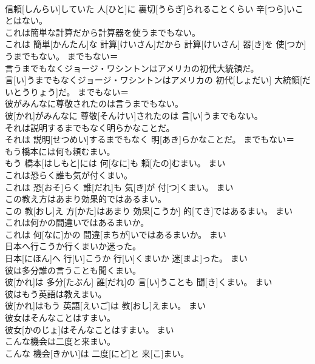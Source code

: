 \documentclass[8pt]{extreport}
\begin{document}
\begin{CJK}{UTF8}{min}
\\	信頼[しんらい]していた 人[ひと]に 裏切[うらぎ]られることくらい 辛[つら]いことはない。	
\\	これは簡単な計算だから計算器を使うまでもない。	
\\	これは 簡単[かんたん]な 計算[けいさん]だから 計算[けいさん] 器[き]を 使[つか]うまでもない。	までもない＝ 
\\	言うまでもなくジョージ・ワシントンはアメリカの初代大統領だ。	
\\	言[い]うまでもなくジョージ・ワシントンはアメリカの 初代[しょだい] 大統領[だいとうりょう]だ。	までもない＝ 
\\	彼がみんなに尊敬されたのは言うまでもない。	
\\	彼[かれ]がみんなに 尊敬[そんけい]されたのは 言[い]うまでもない。	
\\	それは説明するまでもなく明らかなことだ。	
\\	それは 説明[せつめい]するまでもなく 明[あき]らかなことだ。	までもない＝ 
\\	もう橋本には何も頼むまい。	
\\	もう 橋本[はしもと]には 何[なに]も 頼[たの]むまい。	まい 
\\	これは恐らく誰も気が付くまい。	
\\	これは 恐[おそ]らく 誰[だれ]も 気[き]が 付[つ]くまい。	まい 
\\	この教え方はあまり効果的ではあるまい。	
\\	この 教[おし]え 方[かた]はあまり 効果[こうか] 的[てき]ではあるまい。	まい 
\\	これは何かの間違いではあるまいか。	
\\	これは 何[なに]かの 間違[まちが]いではあるまいか。	まい 
\\	日本へ行こうか行くまいか迷った。	
\\	日本[にほん]へ 行[い]こうか 行[い]くまいか 迷[まよ]った。	まい 
\\	彼は多分誰の言うことも聞くまい。	
\\	彼[かれ]は 多分[たぶん] 誰[だれ]の 言[い]うことも 聞[き]くまい。	まい 
\\	彼はもう英語は教えまい。	
\\	彼[かれ]はもう 英語[えいご]は 教[おし]えまい。	まい 
\\	彼女はそんなことはすまい。	
\\	彼女[かのじょ]はそんなことはすまい。	まい 
\\	こんな機会は二度と来まい。	
\\	こんな 機会[きかい]は 二度[にど]と 来[こ]まい。	

\end{CJK}
\end{document}
